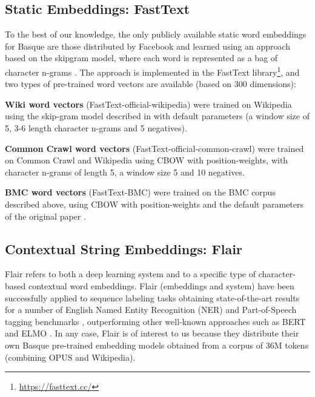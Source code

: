 \documentclass[10pt, a4paper]{article}
\begin{document}
\subsection{Static Embeddings: FastText}\label{sec:build-basq-models:static}

To the best of our knowledge, the only publicly available static word embeddings for Basque are those distributed by Facebook and learned using an approach based on the skipgram model, where  each  word  is  represented as a bag of character n-grams \cite{fasttext1_bojanowski2017enriching}. The approach is implemented in the FastText library\footnote{\url{https://fasttext.cc/}}, and two types of pre-trained word vectors are available (based on 300 dimensions):

\textbf{Wiki word vectors} (FastText-official-wikipedia) were trained on Wikipedia using the skip-gram model described in \cite{fasttext1_bojanowski2017enriching} with default parameters (a window size of 5, 3-6 length character n-grams and 5 negatives).

\textbf{Common Crawl word vectors} (FastText-official-common-crawl) were trained on Common Crawl and Wikipedia using CBOW with position-weights, with character n-grams of length 5, a window size 5 and 10 negatives\cite{fasttext2_grave2018learning}.

\textbf{BMC word vectors} (FastText-BMC) were trained on the BMC corpus described above, using CBOW with position-weights and the default parameters of the original paper \cite{fasttext1_bojanowski2017enriching}.

\subsection{Contextual String Embeddings: Flair}\label{sec:build-basq-models:flair}


Flair refers to both a deep learning system and to a specific type of character-based contextual word embeddings. Flair (embeddings and system) have been successfully applied to sequence labeling tasks obtaining state-of-the-art results for a number of English Named Entity Recognition (NER) and Part-of-Speech tagging benchmarks \cite{akbik2018coling}, outperforming other well-known approaches such as BERT and ELMO \cite{devlin2019bert,Peters:2018}. In any case, Flair is of interest to us because they distribute their own Basque pre-trained embedding models obtained from a corpus of 36M tokens (combining OPUS and Wikipedia).
\end{document}
